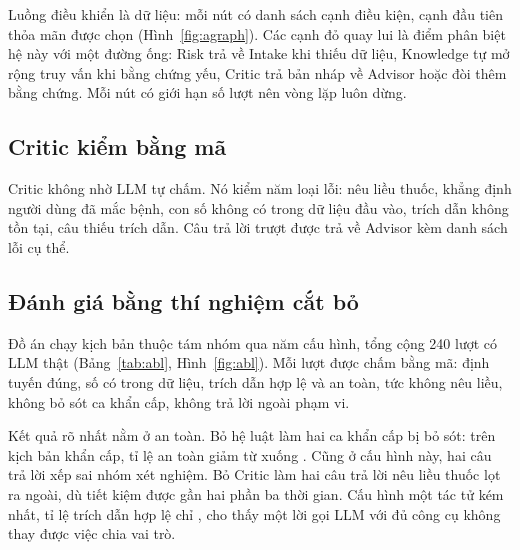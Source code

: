 Luồng điều khiển là dữ liệu: mỗi nút có danh sách cạnh điều kiện, cạnh đầu tiên thỏa mãn được chọn (Hình~\ref{fig:agraph}). Các cạnh đỏ quay lui là điểm phân biệt hệ này với một đường ống: Risk trả về Intake khi thiếu dữ liệu, Knowledge tự mở rộng truy vấn khi bằng chứng yếu, Critic trả bản nháp về Advisor hoặc đòi thêm bằng chứng. Mỗi nút có giới hạn số lượt nên vòng lặp luôn dừng.



\subsection{Critic kiểm bằng mã}

Critic không nhờ LLM tự chấm. Nó kiểm năm loại lỗi: nêu liều thuốc, khẳng định người dùng đã mắc bệnh, con số không có trong dữ liệu đầu vào, trích dẫn không tồn tại, câu thiếu trích dẫn. Câu trả lời trượt được trả về Advisor kèm danh sách lỗi cụ thể.


\subsection{Đánh giá bằng thí nghiệm cắt bỏ}

Đồ án chạy  kịch bản thuộc tám nhóm qua năm cấu hình, tổng cộng 240 lượt có LLM thật (Bảng~\ref{tab:abl}, Hình~\ref{fig:abl}). Mỗi lượt được chấm bằng mã: định tuyến đúng, số có trong dữ liệu, trích dẫn hợp lệ và an toàn, tức không nêu liều, không bỏ sót ca khẩn cấp, không trả lời ngoài phạm vi.

\begin{table}[!htbp]\centering\caption{Thí nghiệm cắt bỏ trên 48 kịch bản, mỗi cấu hình một hàng}\label{tab:abl}
\small\end{table}


Kết quả rõ nhất nằm ở an toàn. Bỏ hệ luật làm hai ca khẩn cấp bị bỏ sót: trên  kịch bản khẩn cấp, tỉ lệ an toàn giảm từ  xuống . Cũng ở cấu hình này, hai câu trả lời xếp sai nhóm xét nghiệm. Bỏ Critic làm hai câu trả lời nêu liều thuốc lọt ra ngoài, dù tiết kiệm được gần hai phần ba thời gian. Cấu hình một tác tử kém nhất, tỉ lệ trích dẫn hợp lệ chỉ , cho thấy một lời gọi LLM với đủ công cụ không thay được việc chia vai trò.

